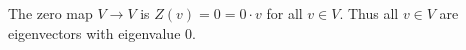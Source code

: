 The zero map $V\to V$ is $Z(v)=0=0\cdot v$ for all $v\in V.$ Thus all $v\in V$ are eigenvectors with eigenvalue $0.$
